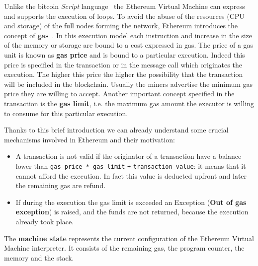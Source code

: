 Unlike the bitcoin \textit{Script} language~\cite{bib:masteringbitcoin} the
Ethereum Virtual Machine can express and supports the execution of loops.
To avoid the abuse of the resources (CPU and storage) of the full nodes
forming the network, Ethereum introduces the concept of
\textbf{gas}~\cite{wood2018ethereum}. In this
execution model each instruction and increase in the size of the memory or
storage are bound to a cost expressed in gas. The price of a gas unit
is known as \textbf{gas price} and is bound to a particular execution.
Indeed this price is specified in the transaction or in the message call
which originates the execution. The higher this price the higher the
possibility that the  transaction will be included in the blockchain.
Usually the miners advertise the minimum gas price they are willing to accept.
Another important concept specified in the transaction is the
\textbf{gas limit}, i.e. the maximum gas amount the executor is willing to
consume for this particular execution.

Thanks to this brief introduction we can already understand some crucial
mechanisms involved in Ethereum and their motivation:
\begin{itemize}
	\item A transaction is not valid if the originator of a transaction have
	a balance lower than \verb|gas_price * gas_limit| \verb|+|
	\verb|transaction_value|:
	it means that it cannot afford the execution. In fact this value is
	deducted upfront and later the remaining gas are refund.
	\item If during the execution the gas limit is exceeded an Exception
	(\textbf{Out of gas exception}) is raised, and the funds are not returned,
	because the execution already took place.
\end{itemize}


The \textbf{machine state} represents the current configuration of the
Ethereum Virtual Machine interpreter.
It consists of the remaining gas, the program counter, the memory and the
stack.
